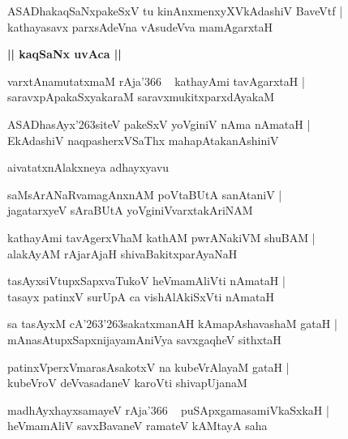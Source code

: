 \documentclass[twoside,12pt,openright]{book}
\def\S{\char'263}
\newcounter{shloka}[chapter]
\def\uvaca#1{\centerline{{\large\textbf{#1}}}}
\begin{document}
\begin{shloka}%
ASADhakaqSaNxpakeSxV tu kinAnxmenxyXVkAdashiV BaveVtf |\\
kathayasavx parxsAdeVna vAsudeVva mamAgarxtaH
\end{shloka}

\uvaca{|| kaqSaNx uvAca ||}

\begin{shloka}%
varxtAnamutatxmaM rAja\char'366 ~ kathayAmi tavAgarxtaH |\\
saravxpApakaSxyakaraM saravxmukitxparxdAyakaM
\end{shloka}

\begin{shloka}%
ASADhasAyx\S siteV pakeSxV yoVginiV nAma nAmataH |\\
EkAdashiV naqpasherxVSaThx mahapAtakanAshiniV
\end{shloka}

\begin{center}
aivatatxnAlakxneya adhayxyavu
\end{center}

\begin{shloka}%
saMsArANaRvamagAnxnAM poVtaBUtA sanAtaniV |\\
jagatarxyeV sAraBUtA yoVginiVvarxtakAriNAM 
\end{shloka}

\begin{shloka}%
kathayAmi tavAgerxVhaM kathAM pwrANakiVM shuBAM |\\
alakAyAM rAjarAjaH shivaBakitxparAyaNaH
\end{shloka}

\begin{shloka}%
tasAyxsiVtupxSapxvaTukoV heVmamAliVti nAmataH |\\
tasayx patinxV surUpA ca vishAlAkiSxVti nAmataH 
\end{shloka}

\begin{shloka}%
sa tasAyxM cA\S\S sakatxmanAH kAmapAshavashaM gataH |\\
mAnasAtupxSapxnijayamAniVya savxgaqheV sithxtaH
\end{shloka}

\begin{shloka}%
patinxVperxVmarasAsakotxV na kubeVrAlayaM gataH |\\
kubeVroV deVvasadaneV karoVti shivapUjanaM
\end{shloka}

\begin{shloka}%
madhAyxhayxsamayeV rAja\char'366 ~ puSApxgamasamiVkaSxkaH |\\
heVmamAliV savxBavaneV ramateV kAMtayA saha 
\end{shloka}
\end{document}
